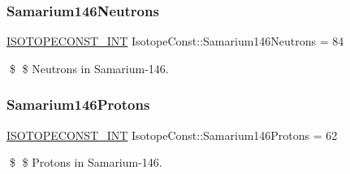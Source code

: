 \subsubsection{\texorpdfstring{Samarium146\+Neutrons}{Samarium146Neutrons}}
{\footnotesize\ttfamily \mbox{\hyperlink{group___isotope_const-_macros_ga5f18360b3e99483a35c32d789e62621c}{I\+S\+O\+T\+O\+P\+E\+C\+O\+N\+S\+T\+\_\+\+I\+NT}} Isotope\+Const\+::\+Samarium146\+Neutrons = 84}

\$ \$ Neutrons in Samarium-\/146. \mbox{\label{group___isotope_const-_samarium-_sm146_ga92649477c205de96de2b2e035f341fac}} 
\subsubsection{\texorpdfstring{Samarium146\+Protons}{Samarium146Protons}}
{\footnotesize\ttfamily \mbox{\hyperlink{group___isotope_const-_macros_ga5f18360b3e99483a35c32d789e62621c}{I\+S\+O\+T\+O\+P\+E\+C\+O\+N\+S\+T\+\_\+\+I\+NT}} Isotope\+Const\+::\+Samarium146\+Protons = 62}

\$ \$ Protons in Samarium-\/146. 
